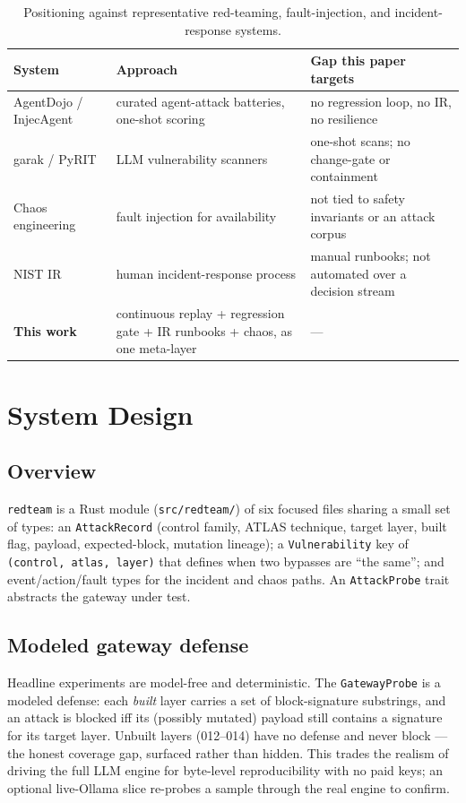 \documentclass[11pt]{article}
\begin{document}
\begin{table}[htb]\centering\small
\begin{tabular}{L{3.0cm}L{4.3cm}L{4.3cm}}
\toprule
System & Approach & Gap this paper targets \\
\midrule
AgentDojo / InjecAgent~\cite{agentdojo2024,injecagent2024} & curated agent-attack batteries, one-shot scoring & no regression loop, no IR, no resilience \\
garak / PyRIT~\cite{garak2024,pyrit} & LLM vulnerability scanners & one-shot scans; no change-gate or containment \\
Chaos engineering~\cite{chaos2016} & fault injection for availability & not tied to safety invariants or an attack corpus \\
NIST IR~\cite{nistir2012} & human incident-response process & manual runbooks; not automated over a decision stream \\
\textbf{This work} & continuous replay + regression gate + IR runbooks + chaos, as one meta-layer & --- \\
\bottomrule
\end{tabular}
\caption{Positioning against representative red-teaming, fault-injection, and
incident-response systems.}
\label{tab:related}
\end{table}

\section{System Design}\label{sec:design}
\subsection{Overview}
\texttt{redteam} is a Rust module (\texttt{src/redteam/}) of six focused files
sharing a small set of types: an \texttt{AttackRecord} (control family, ATLAS
technique, target layer, built flag, payload, expected-block, mutation lineage); a
\texttt{Vulnerability} key of \texttt{(control, atlas, layer)} that defines when two
bypasses are ``the same''; and event/action/fault types for the incident and chaos
paths. An \texttt{AttackProbe} trait abstracts the gateway under test.

\subsection{Modeled gateway defense}
Headline experiments are model-free and deterministic. The \texttt{GatewayProbe} is a
modeled defense: each \emph{built} layer carries a set of block-signature substrings,
and an attack is blocked iff its (possibly mutated) payload still contains a signature
for its target layer. Unbuilt layers (012--014) have no defense and never block ---
the honest coverage gap, surfaced rather than hidden. This trades the realism of
driving the full LLM engine for byte-level reproducibility with no paid keys; an
optional live-Ollama slice re-probes a sample through the real engine to confirm.
\end{document}
